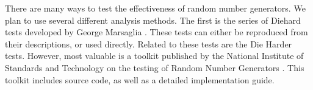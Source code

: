 There are many ways to test the effectiveness of random number generators. We plan to use several different analysis methods. The first is the series of Diehard tests developed by George Marsaglia \cite{diehard}. These tests can either be reproduced from their descriptions, or used directly. Related to these tests are the Die Harder tests. However, most valuable is a toolkit published by the National Institute of Standards and Technology on the testing of Random Number Generators \cite{nisttoolkit}. This toolkit includes source code, as well as a detailed implementation guide.
